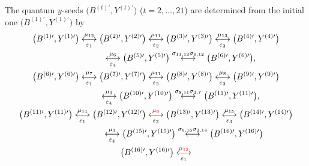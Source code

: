 \documentclass[pdftex]{sigma}
\newcommand\bY{Y}
\numberwithin{equation}{section}
\begin{document}
The quantum $y$-seeds $\bigl(B^{(t)\prime}, Y^{(t)\prime}\bigr)$
($t=2, \dots, 21$) are determined from the initial one
$\bigl(B^{(1)\prime},\allowbreak Y^{(1)\prime}\bigr)$ by
\begin{gather}
\bigl(B^{(1)\prime}, \bY^{(1)\prime}\bigr) \underset{\varepsilon_1}{\overset{\mu_{12}}{\longleftrightarrow}}
\bigl(B^{(2)\prime}, \bY^{(2)\prime}\bigr) \underset{\varepsilon_2}{\overset{\mu_{11}}{\longleftrightarrow}}
\bigl(B^{(3)\prime}, \bY^{(3)\prime}\bigr) \underset{\varepsilon_3}{\overset{\mu_{13}}{\longleftrightarrow}}
\bigl(B^{(4)\prime}, \bY^{(4)\prime}\bigr)\nonumber
\\
\phantom{\bigl(B^{(1)\prime}, \bY^{(1)\prime}\bigr) }{}
\underset{\varepsilon_4}{\overset{\mu_{6}}{\longleftrightarrow}}
\bigl(B^{(5)\prime}, \bY^{(5)\prime}\bigr) \overset{\sigma_{11,13}\sigma_{6,12}}{\longleftrightarrow}
\bigl(B^{(6)\prime}, \bY^{(6)\prime}\bigr),\nonumber
\\
\bigl(B^{(6)\prime}, \bY^{(6)\prime}\bigr) \underset{\varepsilon_1}{\overset{\mu_{7}}{\longleftrightarrow}}
\bigl(B^{(7)\prime}, \bY^{(7)\prime}\bigr) \underset{\varepsilon_2}{\overset{\mu_{11}}{\longleftrightarrow}}
\bigl(B^{(8)\prime}, \bY^{(8)\prime}\bigr) \underset{\varepsilon_3}{\overset{\mu_{8}}{\longleftrightarrow}}
\bigl(B^{(9)\prime}, \bY^{(9)\prime}\bigr)\nonumber
\\
\phantom{\bigl(B^{(6)\prime}, \bY^{(6)\prime}\bigr)}{}
\underset{\varepsilon_4}{\overset{\mu_{3}}{\longleftrightarrow}}
\bigl(B^{(10)\prime}, \bY^{(10)\prime}\bigr) \overset{\sigma_{8,11}\sigma_{3,7}}{\longleftrightarrow}
\bigl(B^{(11)\prime}, \bY^{(11)\prime}\bigr),\nonumber
\\
\bigl(B^{(11)\prime}, \bY^{(11)\prime}\bigr) \underset{\varepsilon_1}{\overset{\mu_{14}}{\longleftrightarrow}}
\bigl(B^{(12)\prime}, \bY^{(12)\prime}\bigr) \underset{\varepsilon_2}{\overset{\begin{color}{red}\mu_{6}\end{color}}{\longleftrightarrow}}
\bigl(B^{(13)\prime}, \bY^{(13)\prime}\bigr) \underset{\varepsilon_3}{\overset{\mu_{15}}{\longleftrightarrow}}
\bigl(B^{(14)\prime}, \bY^{(14)\prime}\bigr)\nonumber
\\
\phantom{\bigl(B^{(11)\prime}, \bY^{(11)\prime}\bigr)}{}
\underset{\varepsilon_4}{\overset{\mu_{3}}{\longleftrightarrow}}
\bigl(B^{(15)\prime}, \bY^{(15)\prime}\bigr) \overset{\sigma_{6,15}\sigma_{3,14}}{\longleftrightarrow}
\bigl(B^{(16)\prime}, \bY^{(16)\prime}\bigr)\nonumber
\\
\bigl(B^{(16)\prime}, \bY^{(16)\prime}\bigr) \underset{\varepsilon_1}{\overset{\begin{color}{red}\mu_{12}\end{color}}{\longleftrightarrow} }

\end{gather}
\end{document}
